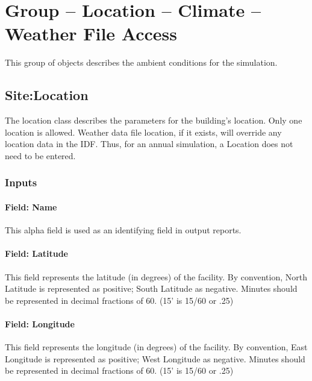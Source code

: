 \section{Group -- Location -- Climate -- Weather File Access}\label{group-location-climate-weather-file-access}

This group of objects describes the ambient conditions for the simulation.

\subsection{Site:Location}\label{sitelocation}

The location class describes the parameters for the building's location. Only one location is allowed. Weather data file location, if it exists, will override any location data in the IDF. Thus, for an annual simulation, a Location does not need to be entered.

\subsubsection{Inputs}\label{inputs-026}

\paragraph{Field: Name}\label{field-name-025}

This alpha field is used as an identifying field in output reports.

\paragraph{Field: Latitude}\label{field-latitude}

This field represents the latitude (in degrees) of the facility. By convention, North Latitude is represented as positive; South Latitude as negative. Minutes should be represented in decimal fractions of 60. (15' is 15/60 or .25)

\paragraph{Field: Longitude}\label{field-longitude}

This field represents the longitude (in degrees) of the facility. By convention, East Longitude is represented as positive; West Longitude as negative. Minutes should be represented in decimal fractions of 60. (15' is 15/60 or .25)

